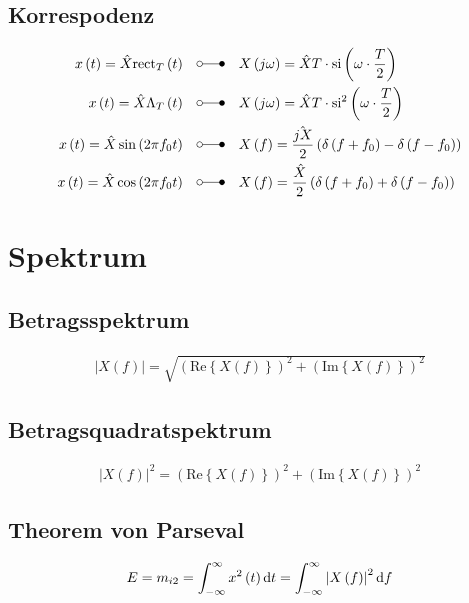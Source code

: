 \subsection*{Korrespodenz}
\begin{align*}
x\left(t\right) =\hat{X}\mathrm{rect}_{T}\left(t\right) \quad &\laplace \quad X\left(j\omega\right)
=\hat{X}T\cdot\mathrm{si}\left({\omega\cdot\frac{T}{2}}\right)\\
x\left(t\right) =\hat{X}\Lambda_{T}\left(t\right) \quad &\laplace \quad X\left(j\omega\right)
=\hat{X}T\cdot\mathrm{si}^2\left({\omega\cdot\frac{T}{2}}\right)\\
x\left(t\right) =\hat{X}\sin\left(2\pi f_0 t\right) \quad &\laplace \quad X\left(f\right)
=\frac{\hat{jX}}{2}\left(\delta\left(f+f_0\right)-\delta\left(f-f_0\right)\right)\\
x\left(t\right) =\hat{X}\cos\left(2\pi f_0 t\right) \quad &\laplace \quad X\left(f\right)
=\frac{\hat{X}}{2}\left(\delta\left(f+f_0\right)+\delta\left(f-f_0\right)\right)
\end{align*}

\section{Spektrum}
\subsection*{Betragsspektrum}
\begin{align*}
\left|X\left(f\right)\right|=\sqrt{\left(\text{Re}\left\{X\left(f\right)\right\}\right)^2+\left(\text{Im}\left\{X\left(f\right)\right\}\right)^2}
\end{align*}

\subsection*{Betragsquadratspektrum}
\begin{align*}
\left|X\left(f\right)\right|^2 =\left(\text{Re}\left\{X\left(f\right)\right\}\right)^2+\left(\text{Im}\left\{X\left(f\right)\right\}\right)^2
\end{align*}

\subsection*{Theorem von Parseval}
\begin{align*}
E =m_{i2}=\int_{-\infty}^\infty x^2\left(t\right)\mathop{}\!\mathrm{d} t=\int_{-\infty}^\infty \left|X\left(f\right)\right|^2\mathop{}\!\mathrm{d} f
\end{align*}

